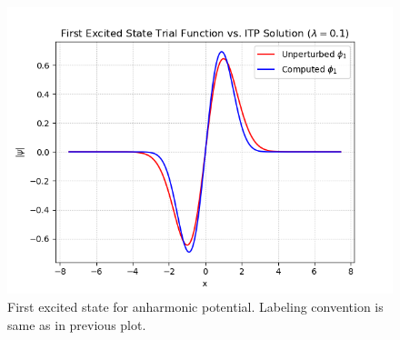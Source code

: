 \documentclass[onecolumn,english,aps,pra]{revtex4}
\begin{document}
\begin{figure}[H]
\center
\includegraphics[scale=0.7]{../Plots/Anharmonic/FirstExcitedState}
\caption{First excited state for anharmonic potential. Labeling convention is same as in previous plot.}
\label{fig:FirstExcitedState}
\end{figure}
\end{document}

